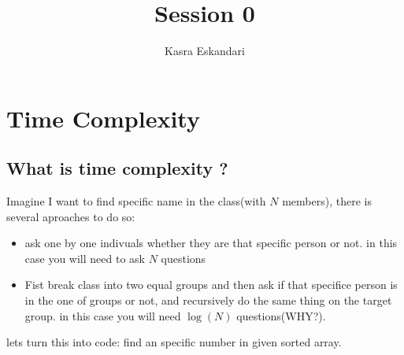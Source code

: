 \documentclass[11pt]{article}
\title{Session 0}
\author{Kasra Eskandari}
\begin{document}
    \maketitle

    \tableofcontents
    \newpage




    \hypertarget{time-complexity}{%
\section{Time Complexity}\label{time-complexity}}

    \hypertarget{what-is-time-complexity}{%
\subsection{What is time complexity ?}\label{what-is-time-complexity}}

Imagine I want to find specific name in the class(with \(N\) members),
there is several aproaches to do so:

\begin{itemize}
\item
  ask one by one indivuals whether they are that specific person or not.
  in this case you will need to ask \(N\) questions
\item
  Fist break class into two equal groups and then ask if that specifice
  person is in the one of groups or not, and recursively do the same
  thing on the target group. in this case you will need \(\log(N)\)
  questions(WHY?).
\end{itemize}

lets turn this into code: find an specific number in given sorted array.
\end{document}
